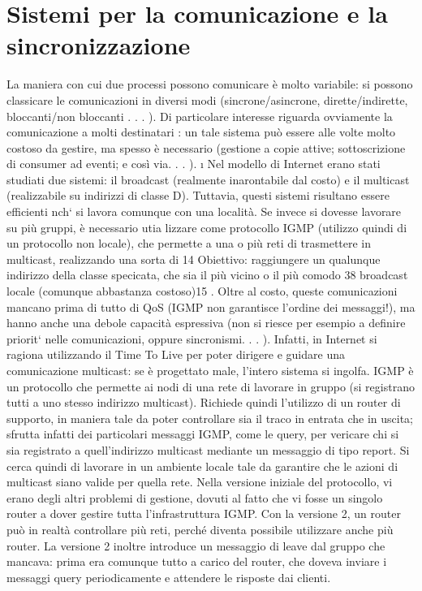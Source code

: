 \section{Sistemi per la comunicazione e la sincronizzazione}
La maniera con cui due processi possono comunicare è molto variabile: si
possono classicare le comunicazioni in diversi modi (sincrone/asincrone, dirette/indirette, bloccanti/non bloccanti . .
. ). Di particolare interesse riguarda
ovviamente la comunicazione a molti destinatari : un tale sistema può essere alle
volte molto costoso da gestire, ma spesso è necessario (gestione a copie attive;
sottoscrizione di consumer ad eventi; e così via. . . ).
\i{}
Nel modello di Internet erano stati studiati due sistemi: il broadcast (realmente inarontabile dal costo) e il multicast
(realizzabile su indirizzi di classe
D). Tuttavia, questi sistemi risultano essere efficienti nch` si lavora comunque
con una località. Se invece si dovesse lavorare su più gruppi, è necessario utia
lizzare come protocollo IGMP (utilizzo quindi di un protocollo non locale), che
permette a una o più reti di trasmettere in multicast, realizzando una sorta di
14 Obiettivo: raggiungere un qualunque indirizzo della classe specicata, che sia il più vicino
o il più comodo
38
broadcast locale (comunque abbastanza costoso)15 . Oltre al costo, queste comunicazioni mancano prima di tutto di QoS
(IGMP non garantisce l'ordine dei
messaggi!), ma hanno anche una debole capacità espressiva (non si riesce per
esempio a definire priorit` nelle comunicazioni, oppure sincronismi. . . ). Infatti,
in Internet si ragiona utilizzando il Time To Live per poter dirigere e guidare
una comunicazione multicast: se è progettato male, l'intero sistema si ingolfa.
IGMP è un protocollo che permette ai nodi di una rete di lavorare in gruppo
(si registrano tutti a uno stesso indirizzo multicast). Richiede quindi l'utilizzo
di un router di supporto, in maniera tale da poter controllare sia il traco in
entrata che in uscita; sfrutta infatti dei particolari messaggi IGMP, come le
query, per vericare chi si sia registrato a quell'indirizzo multicast mediante un
messaggio di tipo report. Si cerca quindi di lavorare in un ambiente locale tale
da garantire che le azioni di multicast siano valide per quella rete.
Nella versione iniziale del protocollo, vi erano degli altri problemi di gestione,
dovuti al fatto che vi fosse un singolo router a dover gestire tutta l'infrastruttura
IGMP. Con la versione 2, un router può in realtà controllare più reti, perché
diventa possibile utilizzare anche più router. La versione 2 inoltre introduce un
messaggio di leave dal gruppo che mancava: prima era comunque tutto a carico
del router, che doveva inviare i messaggi query periodicamente e attendere le
risposte dai clienti.
